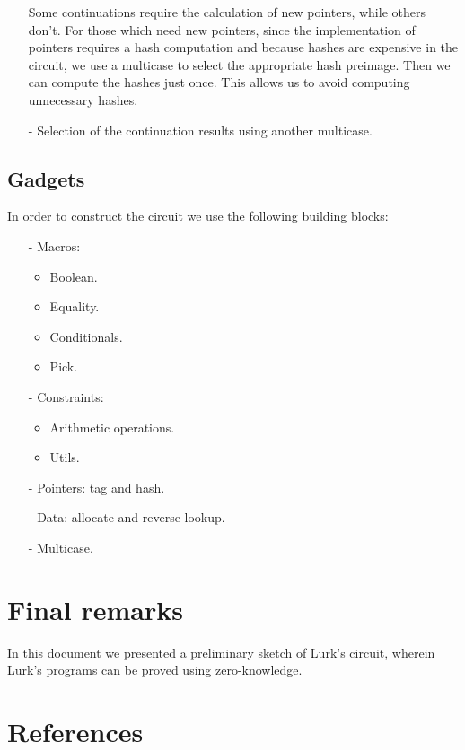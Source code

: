 \documentclass[10pt, english]{article}
\begin{document}
\begin{itemize}
Some continuations require the calculation of new pointers, while others don't. For those which need new pointers, since the implementation of pointers requires a hash computation and because hashes are expensive in the circuit, we use a multicase to select the appropriate hash preimage. Then we can compute the hashes just once. This allows us to avoid computing unnecessary hashes.
	\item[-] Selection of the continuation results using another multicase.
\end{itemize}

\subsection{Gadgets}

In order to construct the circuit we use the following building blocks:

\begin{itemize}
	\item[-] Macros:
	\begin{itemize}
		\item Boolean.
	    \item Equality.
		\item Conditionals.
		\item Pick.
	\end{itemize}
	\item[-] Constraints:
	\begin{itemize}
        \item Arithmetic operations.
		\item Utils.
	\end{itemize}
	\item[-] Pointers: tag and hash.
    \item[-] Data: allocate and reverse lookup.
    \item[-] Multicase.
\end{itemize}

\section{Final remarks}

In this document we presented a preliminary sketch of Lurk's circuit, wherein Lurk's programs can be proved using zero-knowledge.

\section{References}




\end{document}
